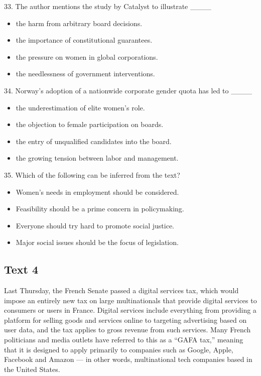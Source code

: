 \documentclass[UTF8,11pt]{ctexart}
\begin{document}
33. The author mentions the study by Catalyst to illustrate \_\_\_\_


\begin{itemize}[leftmargin=2em,itemsep=.2em,topsep=.4em]\item[A.] the harm from arbitrary board decisions.
\item[B.] the importance of constitutional guarantees.
\item[C.] the pressure on women in global corporations.
\item[D.] the needlessness of government interventions.
\end{itemize}

34. Norway’s adoption of a nationwide corporate gender quota has led to \_\_\_\_


\begin{itemize}[leftmargin=2em,itemsep=.2em,topsep=.4em]\item[A.] the underestimation of elite women’s role.
\item[B.] the objection to female participation on boards.
\item[C.] the entry of unqualified candidates into the board.
\item[D.] the growing tension between labor and management.
\end{itemize}

35. Which of the following can be inferred from the text?


\begin{itemize}[leftmargin=2em,itemsep=.2em,topsep=.4em]\item[A.] Women’s needs in employment should be considered.
\item[B.] Feasibility should be a prime concern in policymaking.
\item[C.] Everyone should try hard to promote social justice.
\item[D.] Major social issues should be the focus of legislation.
\end{itemize}

\subsection*{\textbf{Text 4}}


Last Thursday, the French Senate passed a digital services tax, which would impose an entirely new tax on large multinationals that provide digital services to consumers or users in France. Digital services include everything from providing a platform for selling goods and services online to targeting advertising based on user data, and the tax applies to gross revenue from such services. Many French politicians and media outlets have referred to this as a “GAFA tax,” meaning that it is designed to apply primarily to companies such as Google, Apple, Facebook and Amazon — in other words, multinational tech companies based in the United States.
\end{document}
